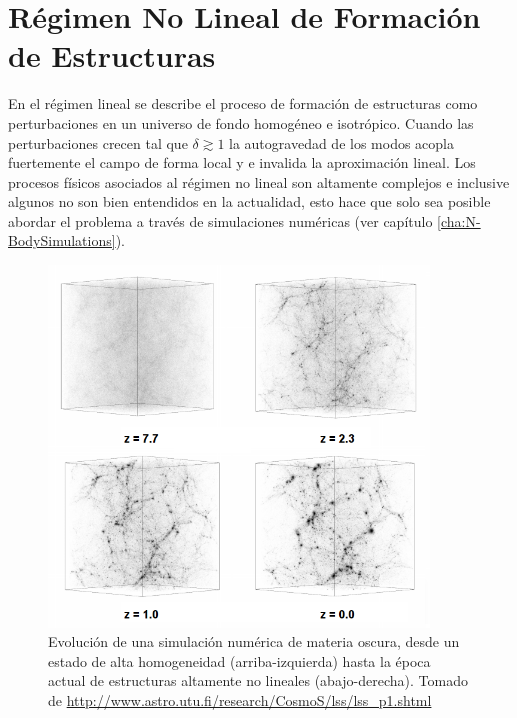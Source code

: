 \section{Régimen No Lineal de Formación de Estructuras}
\label{sec:NonLinearStructureFormation}


En el régimen lineal se describe el proceso de formación de estructuras 
como perturbaciones en un universo de fondo homogéneo e isotrópico. Cuando
las perturbaciones crecen tal que $\delta \gtrsim 1$ la autogravedad de 
los modos acopla fuertemente el campo de forma local y e invalida la 
aproximación lineal. Los procesos físicos asociados al régimen no lineal
son altamente complejos e inclusive algunos no son bien entendidos en la 
actualidad, esto hace que solo sea posible abordar el problema a través de
simulaciones numéricas (ver capítulo 
\ref{cha:N-BodySimulations}).


\begin{figure}[htbp]
	\centering
	\includegraphics[width=0.9\textwidth]
	{./figures/2_theoretical_framework/Nonlinear.png}

	\caption{\small{Evolución de una simulación numérica de materia oscura,
	desde un estado de alta homogeneidad (arriba-izquierda) hasta la época
	actual de estructuras altamente no lineales (abajo-derecha). Tomado de
	\url{http://www.astro.utu.fi/research/CosmoS/lss/lss_p1.shtml}}}
	
	\label{fig:NonLinearUniverse}
\end{figure}


